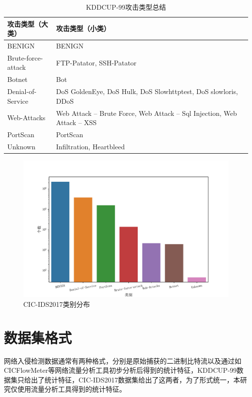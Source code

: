\begin{table}[htb]
  \centering
  \caption{KDDCUP-99攻击类型总结}
  \begin{tabular}{p{0.2\linewidth}p{0.8\linewidth}}
    \toprule
    \textbf{攻击类型（大类）} & \textbf{攻击类型（小类）} \\
    \midrule
    BENIGN & BENIGN \\
    Brute-force-attack & FTP-Patator, SSH-Patator \\
    Botnet & Bot \\
    Denial-of-Service & DoS GoldenEye, DoS Hulk, DoS Slowhttptest, DoS slowloris, DDoS \\
    Web-Attacks & Web Attack – Brute Force, Web Attack – Sql Injection, Web Attack – XSS \\
    PortScan & PortScan \\
    Unknown & Infiltration, Heartbleed \\
    \bottomrule
  \end{tabular}
  \label{table:cic2017_attack_types}
\end{table}
\begin{figure}[htb]
\centering %
\includegraphics[width=.95\linewidth]{img/preprocessing/cic2017_category.pdf} %
\caption{CIC-IDS2017类别分布}
\label{fig:cic2017_category} %
\end{figure}%

\section{数据集格式}
网络入侵检测数据通常有两种格式，分别是原始捕获的二进制比特流以及通过如CICFlowMeter等网络流量分析工具初步分析后得到的统计特征，KDDCUP-99数据集只给出了统计特征，CIC-IDS2017数据集给出了这两者，为了形式统一，本研究仅使用流量分析工具得到的统计特征。
